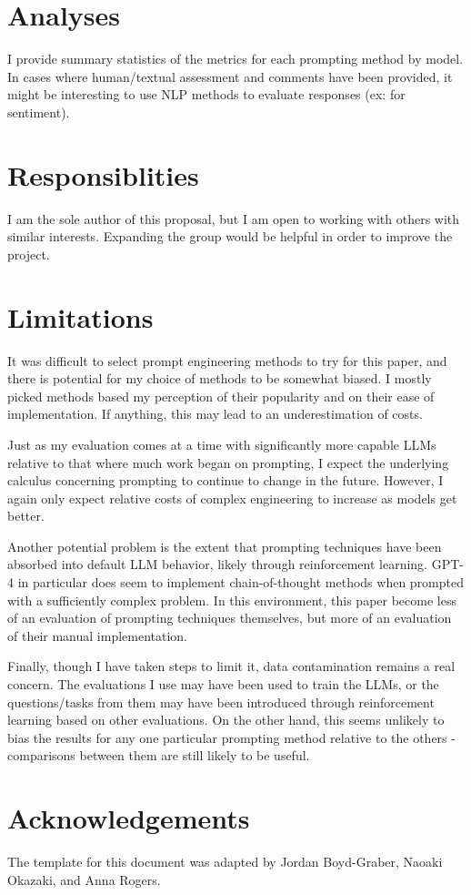 \documentclass[11pt]{article}
\begin{document}
\section*{Analyses}

I provide summary statistics of the metrics for each prompting method by model. In cases where human/textual assessment and comments have been provided, it might be interesting to use NLP methods to evaluate responses (ex: for sentiment).

\section*{Responsiblities}

I am the sole author of this proposal, but I am open to working with others with similar interests. Expanding the group would be helpful in order to improve the project.

\section*{Limitations}

It was difficult to select prompt engineering methods to try for this paper, and there is potential for my choice of methods to be somewhat biased. I mostly picked methods based my perception of their popularity and on their ease of implementation. If anything, this may lead to an underestimation of costs.

Just as my evaluation comes at a time with significantly more capable LLMs relative to that where much work began on prompting, I expect the underlying calculus concerning prompting to continue to change in the future. However, I again only expect relative costs of complex engineering to increase as models get better.

Another potential problem is the extent that prompting techniques have been absorbed into default LLM behavior, likely through reinforcement learning. GPT-4 in particular does seem to implement chain-of-thought methods when prompted with a sufficiently complex problem. In this environment, this paper become less of an evaluation of prompting techniques themselves, but more of an evaluation of their manual implementation.

Finally, though I have taken steps to limit it, data contamination remains a real concern. The evaluations I use may have been used to train the LLMs, or the questions/tasks from them may have been introduced through reinforcement learning based on other evaluations. On the other hand, this seems unlikely to bias the results for any one particular prompting method relative to the others - comparisons between them are still likely to be useful.

\section*{Acknowledgements}
The template for this document was adapted by Jordan Boyd-Graber, Naoaki Okazaki, and Anna Rogers.



\end{document}
